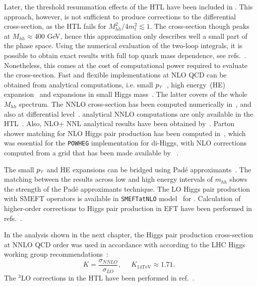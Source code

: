 \par Later, the threshold resummation effects of the HTL have been included in \cite{Shao:2013bz}. This approach, however, is not sufficient to produce corrections to the differential cross-section, as the HTL fails for $M_{hh}^2/4m_t^2 \lesssim 1$. The cross-section though peaks at $ M_{hh}\approx 400$ GeV, hence this approximation only describes well a small part of the phase space. Using the numerical evaluation of the two-loop integrals, it is possible to obtain exact results with full top quark mass dependence, see refs.~\cite{Borowka:2016ypz,Borowka:2016ehy,Baglio:2018lrj}. Nonetheless, this comes at the cost of computational power required to evaluate the cross-section. Fast and flexible implementations at NLO QCD can be obtained from analytical computations, i.e. small $p_{\scriptscriptstyle T}$~\cite{Bonciani:2018omm}, high energy~(HE) expansion~\cite{Davies:2018ood} and expansions in small Higgs mass~\cite{Xu:2018eos,Wang:2020nnr}. The latter covers of the whole $M_{hh}$ spectrum. The NNLO cross-section has been computed numerically in~\cite{Grazzini:2018bsd}, and also at differential level~\cite{deFlorian:2016uhr}. analytical NNLO computations are only available in the HTL~\cite{deFlorian:2013jea}. Also, NLO+ NNL analytical results have been obtained by~\cite{deFlorian:2015moa}. Parton shower matching for NLO Higgs pair production has been computed  in~\cite{Jones:2017giv}, which was essential for the \texttt{POWHEG} implementation for di-Higgs, with NLO corrections computed from a grid that has been made available by ~\cite{Heinrich:2017kxx,Heinrich:2019bkc,Heinrich:2020ckp}. 
\par  The small $p_{\scriptscriptstyle T}$ and HE expansions can be bridged using Pad\'e  approximants~\cite{Bellafronte:2022jmo}.  The matching between the results across low and high energy intervals of $m_{hh}$ shows the strength of the Pad\'e  approximants technique. The LO Higgs pair production with SMEFT operators is available in \texttt{SMEFTatNLO} model~\cite{Degrande:2020evl} for \Madgraph. Calculation of higher-order corrections to Higgs pair production in EFT have been performed in refs.~\cite{Grober:2014zva,Grober:2015cwa,deFlorian:2017qfk,Buchalla:2018yce}.
\par In the analysis shown in the next chapter, the Higgs pair production cross-section at NNLO QCD order was used in accordance with according to the LHC Higgs working group recommendations~\cite{Dittmaier:2012vm,deFlorian:2016spz}:
\begin{equation}
	K = \frac{\sigma_{NNLO}}{\sigma_{LO}}, \;\;\;\;\; K_{14 \mathrm{TeV}} \approx 1.71.
\end{equation}
The $^3$LO corrections in the HTL have been performed in ref.~\cite{Chen:2019fhs}.
